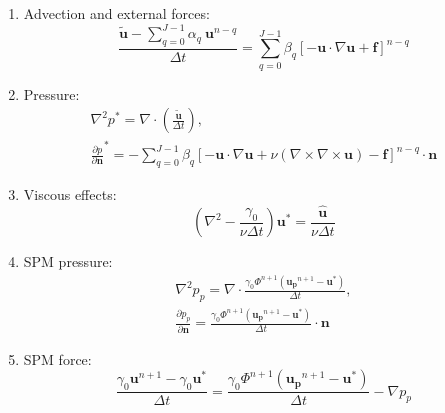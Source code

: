 \begin{enumerate}
    \item Advection and external forces:
        \begin{equation}
            \frac{\mathbf{\tilde{u}}-\sum_{q=0}^{J-1}\alpha_q~\mathbf{u}^{n-q}}
                {\Delta t} = \sum_{q=0}^{J-1}\beta_q\left[-\mathbf{u}\cdot
                \nabla\mathbf{u}+\mathbf{f}\right]^{n-q}
        \end{equation}
    \item Pressure:
        \begin{subequations}
        \begin{gather}
            \nabla^2 p^* = \nabla\cdot\left(\frac{\mathbf{\tilde{u}}}
                {\Delta t}\right),\\
            \frac{\partial p}{\partial\mathbf{n}}^* = -\sum_{q=0}^{J-1}\beta_q
                \left[-\mathbf{u}\cdot\nabla\mathbf{u}+\nu(\nabla\times\nabla
                \times\mathbf{u})-\mathbf{f}\right]^{n-q}\cdot\mathbf{n}
        \end{gather}
        \end{subequations}
    \item Viscous effects:
        \begin{equation}
            \left(\nabla^2 - \frac{\gamma_0}{\nu\Delta t}\right)\mathbf{u^*} =
                \frac{\mathbf{\hat{u}}}{\nu\Delta t}
        \end{equation}
    \item SPM pressure:
        \begin{subequations}
        \begin{gather}
            \nabla^2 p_p = \nabla\cdot\frac{\gamma_0\Phi^{n+1}(
                \mathbf{u_p}^{n+1}-\mathbf{u^*})}{\Delta t},\\[3mm]
            \frac{\partial p_p}{\partial\mathbf{n}} = \frac{\gamma_0\Phi^{n+1}
                (\mathbf{u_p}^{n+1}-\mathbf{u^*})}{\Delta t}\cdot\mathbf{n}
        \end{gather}
        \end{subequations}
    \item SPM force:
        \begin{equation} \label{eq:SPM:incompressiblePressure}
            \frac{\gamma_0\mathbf{u}^{n+1}-\gamma_0\mathbf{u^*}}{\Delta t} =
                \frac{\gamma_0\Phi^{n+1}(\mathbf{u_p}^{n+1}-\mathbf{u^*})}
                {\Delta t} - \nabla p_p
        \end{equation}
\end{enumerate}

